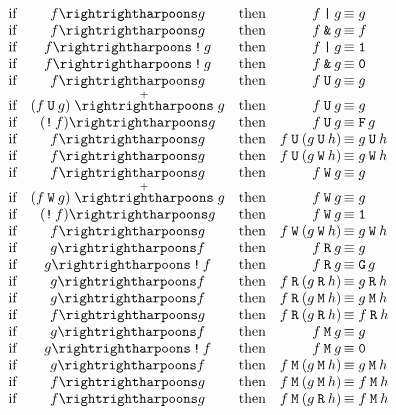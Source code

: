 \documentclass[a4paper,twoside,10pt,DIV=12,draft]{scrreprt}
\DeclareMathOperator{\F}{\texttt{F}}
\DeclareMathOperator{\G}{\texttt{G}}
\newcommand{\U}{\mathbin{\texttt{U}}}
\newcommand{\R}{\mathbin{\texttt{R}}}
\newcommand{\M}{\mathbin{\texttt{M}}}
\newcommand{\W}{\mathbin{\texttt{W}}}
\DeclareMathOperator{\NOT}{\texttt{!}}
\newcommand{\OR}{\mathbin{\texttt{|}}}
\newcommand{\AND}{\mathbin{\texttt{\&}}}
\newcommand{\0}{\texttt{0}}
\newcommand{\1}{\texttt{1}}
\def\simp{\rightrightharpoons}
\def\Simp{\stackrel{+}{\simp}}
\begin{document}
\begin{equation*}
\begin{array}{cccr@{\,}l}
\text{if}& f\simp g        &\text{then}& f\OR g &\equiv g \\
\text{if}& f\simp g        &\text{then}& f\AND g &\equiv f \\
\text{if}& f\simp \NOT g   &\text{then}& f\OR g &\equiv \1 \\
\text{if}& f\simp \NOT g   &\text{then}& f\AND g &\equiv \0 \\
\text{if}& f\simp g        &\text{then}& f\U g &\equiv g \\
\text{if}& (f\U g)\Simp g  &\text{then}& f\U g &\equiv g \\
\text{if}& (\NOT f)\simp g &\text{then}& f\U g &\equiv \F g \\
\text{if}& f\simp g        &\text{then}& f\U (g \U h) &\equiv g \U h \\
\text{if}& f\simp g        &\text{then}& f\U (g \W h) &\equiv g \W h \\
\text{if}& f\simp g        &\text{then}& f\W g &\equiv g \\
\text{if}& (f\W g)\Simp g  &\text{then}& f\W g &\equiv g \\
\text{if}& (\NOT f)\simp g &\text{then}& f\W g &\equiv \1 \\
\text{if}& f\simp g        &\text{then}& f\W (g \W h) &\equiv g \W h \\
\text{if}& g\simp f        &\text{then}& f\R g &\equiv g \\
\text{if}& g\simp \NOT f   &\text{then}& f\R g &\equiv \G g \\
\text{if}& g\simp f        &\text{then}& f\R (g \R h) &\equiv g \R h \\
\text{if}& g\simp f        &\text{then}& f\R (g \M h) &\equiv g \M h \\
\text{if}& f\simp g        &\text{then}& f\R (g \R h) &\equiv f \R h \\
\text{if}& g\simp f        &\text{then}& f\M g &\equiv g \\
\text{if}& g\simp \NOT f   &\text{then}& f\M g &\equiv \0 \\
\text{if}& g\simp f        &\text{then}& f\M (g \M h) &\equiv g \M h \\
\text{if}& f\simp g        &\text{then}& f\M (g \M h) &\equiv f \M h \\
\text{if}& f\simp g        &\text{then}& f\M (g \R h) &\equiv f \M h \\
\end{array}
\end{equation*}
\end{document}
